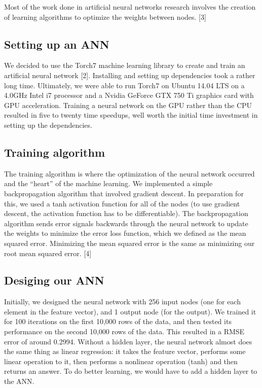 \documentclass{article}
\begin{document}
Most of the work done in artificial neural networks research
 involves the creation of
 learning algorithms to optimize the weights between nodes.  [3]
 

\subsection{Setting up an ANN}

We decided to use the Torch7 machine learning library to create and 
train an artificial neural network [2].  Installing and
 setting up dependencies took a rather long time.  Ultimately, we were
  able to run Torch7 on Ubuntu 14.04 LTS on a 4.0GHz Intel i7 processor
   and a Nvidia GeForce GTX 750 Ti graphics card with GPU acceleration. 
    Training a neural network on the GPU rather than the CPU resulted in
     five to twenty time speedups, well worth the initial time investment
      in setting up the dependencies.


\subsection{Training algorithm}
The training algorithm is where the optimization of the neural network
 occurred and the ``heart'' of the machine learning.  We implemented 
 a simple backpropagation algorithm that involved gradient descent.  In 
 preparation for this, we used a tanh activation function for all of the
  nodes (to use gradient descent, the activation function has to be differentiable). 
   The backpropagation algorithm sends error signals backwards through the neural
    network to update the weights to minimize the error loss function, which we
     defined as the mean squared error.  Minimizing the mean squared error is
      the same as minimizing our root mean squared error. [4]

\subsection{Desiging our ANN}
Initially, we designed the neural network with 256 input nodes
 (one for each element in the feature vector), and 1 output node
  (for the output).  We trained it for 100 iterations on the first 
  10,000 rows of the data, and then tested its performance on the 
  second 10,000 rows of the data.  This resulted in a RMSE error of
   around 0.2994.  Without a hidden layer, the neural network almost
    does the same thing as linear regression: it takes the feature
     vector, performs some linear operation to it, then performs a 
     nonlinear operation (tanh) and then returns an answer.  To do better
      learning, we would have to add a hidden layer to the ANN.
\end{document}

